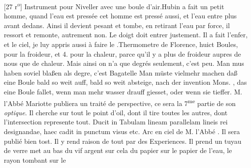         \vspace*{8mm}
        \pstart 
        \normalsize
      [27 r\textsuperscript{o}] Instrument pour Niveller\protect{} avec une boule d'air.\pend \pstart Hubin\protect{} a fait un petit homme, quand l'eau est press\'{e}e  cet homme est press\'{e} aussi, et l'eau entre plus avant dedans. Ainsi il devient pesant et tombe, en retirant l'eau par force, il ressort et remonte, autrement non. Le doigt doit entrer justement. Il a fait l'enfer, et le ciel, je luy appris aussi \`{a} faire le .\pend \pstart Thermometre de Florence\protect{}, huict Boules, pour la froideur, et 4. pour la chaleur\protect{}, parce qu'il y a plus de froideur\protect{} aupres de nous que de chaleur\protect{}. Mais ainsi on n'a que  degr\'{e}s seulement, c'est peu. Man mus haben soviel blaßen als degre, c'est Bagatelle Man m\"{u}ste vielmehr machen daß eine Boule bald so weit auff, bald so weit absteige, nach der invention Mons. \protect{}, das eine Boule fallet, wenn man mehr wasser drauff giesset, oder wenn sie tieffer. M. l'Abb\'{e} Mariotte\protect{} publiera un trait\'{e} de perspective\protect{}, ce sera la 7\textsuperscript{me} partie de son \textit{optique}. Il cherche sur tout le point d'oil, dont il tire toutes les autres, dont l'intersection represente tout. Ducit in Tabulam lineam parallelam lineis rei designandae, haec cadit in punctum visus etc. \pend \pstart Arc en ciel\protect{}  de M. l'Abb\'{e} . Il sera publi\'{e} bien tost. Il y rend raison de tout par des Experiences. Il prend un tuyau de verre met au bas du vif argent\protect{} sur cela du papier sur le papier de l'eau, le rayon  tombant sur le 